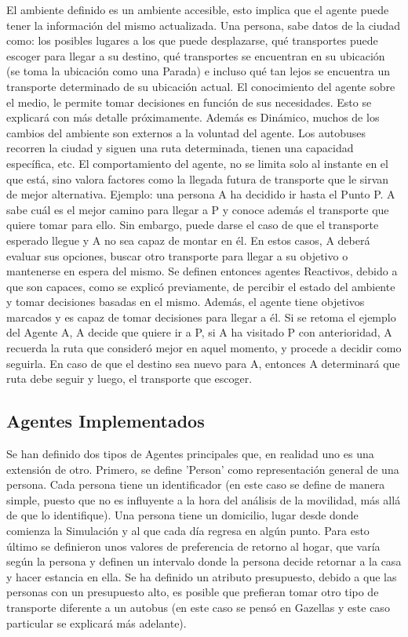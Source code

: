 \documentclass{article}
\begin{document}
El ambiente definido es un ambiente accesible, esto implica que el agente puede tener la información del mismo actualizada. Una persona, sabe datos de la ciudad como: los posibles lugares a los que puede desplazarse, qué transportes puede escoger para llegar a su destino, qué transportes se encuentran en su ubicación (se toma la ubicación como una Parada) e incluso qué tan lejos se encuentra un transporte determinado de su ubicación actual. El conocimiento del agente sobre el medio, le permite tomar decisiones en función de sus necesidades. Esto se explicará con más detalle próximamente.
Además es Dinámico, muchos de los cambios del ambiente son externos a la voluntad del agente. Los autobuses recorren la ciudad y siguen una ruta determinada, tienen una capacidad específica, etc.
El comportamiento del agente, no se limita solo al instante en el que está, sino valora factores como la llegada futura de transporte que le sirvan de mejor alternativa. Ejemplo: una persona A ha decidido ir hasta el Punto P. A sabe cuál es el mejor camino para llegar a P y conoce además el transporte que quiere tomar para ello. Sin embargo, puede darse el caso de que el transporte esperado llegue y A no sea capaz de montar en él. En estos casos, A deberá evaluar sus opciones, buscar otro transporte para llegar a su objetivo o mantenerse en espera del mismo. Se definen entonces agentes Reactivos, debido a que son capaces, como se explicó previamente, de percibir el estado del ambiente y tomar decisiones basadas en el mismo. Además, el agente tiene objetivos marcados y es capaz de tomar decisiones para llegar a él. Si se retoma el ejemplo del Agente A, A decide que quiere ir a P, si A ha visitado P con anterioridad, A recuerda la ruta que consideró mejor en aquel momento, y procede a decidir como seguirla. En caso de que el destino sea nuevo para A, entonces A determinará que ruta debe seguir y luego, el transporte que escoger.

\subsection{Agentes Implementados}
Se han definido dos tipos de Agentes principales que, en realidad uno es una extensión de otro. 
Primero, se define 'Person' como representación general de una persona. Cada persona tiene un identificador (en este caso se define de manera simple, puesto que no es influyente a la hora del análisis de la movilidad, más allá de que lo identifique). Una persona tiene un domicilio, lugar desde donde comienza la Simulación y al que cada día regresa en algún punto. Para esto último se definieron unos valores de preferencia de retorno al hogar, que varía según la persona y definen un intervalo donde la persona decide retornar a la casa y hacer estancia en ella. Se ha definido un atributo presupuesto, debido a que las personas con un presupuesto alto, es posible que prefieran tomar otro tipo de transporte diferente a un autobus (en este caso se pensó en Gazellas y este caso particular se explicará más adelante). 
\end{document}
